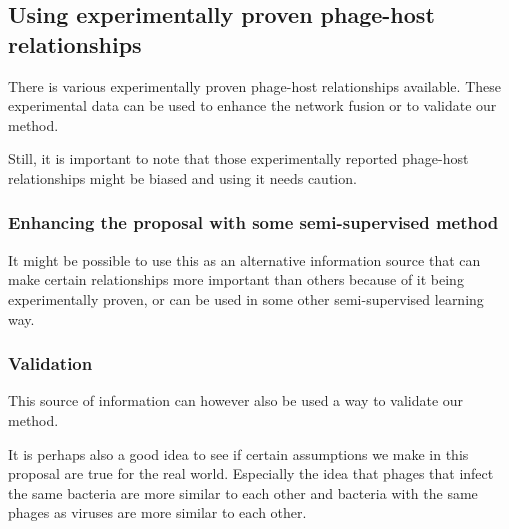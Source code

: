 \documentclass{article}
\begin{document}
\subsection{Using experimentally proven phage-host relationships}

There is various experimentally proven phage-host relationships available. 
These experimental data can be used to enhance the network fusion or 
to validate our method. 

Still, it is important to note that those experimentally reported phage-host
relationships might be biased and using it needs caution.

\subsubsection{Enhancing the proposal with some semi-supervised method}

It might be possible to use this as an alternative information source that
can make certain relationships more important than others because
of it being experimentally proven, or can be used in some other semi-supervised
learning way.

\subsubsection{Validation}

This source of information can however also be used a way to validate
our method. 

It is perhaps also a good idea to see if certain assumptions we make in 
this proposal are true for the real world. 
Especially the idea that phages that infect the same
bacteria are more similar to each other and bacteria with the same phages
as viruses are more similar to each other.

\printbibliography{}
\end{document}
